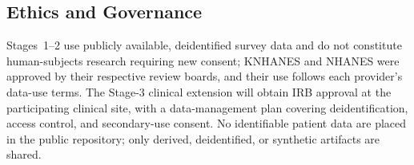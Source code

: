 \subsection{Ethics and Governance}
Stages~1--2 use publicly available, deidentified survey data and do not constitute human-subjects research requiring new consent; KNHANES and NHANES were approved by their respective review boards, and their use follows each provider's data-use terms. The Stage-3 clinical extension will obtain IRB approval at the participating clinical site, with a data-management plan covering deidentification, access control, and secondary-use consent. No identifiable patient data are placed in the public repository; only derived, deidentified, or synthetic artifacts are shared.

